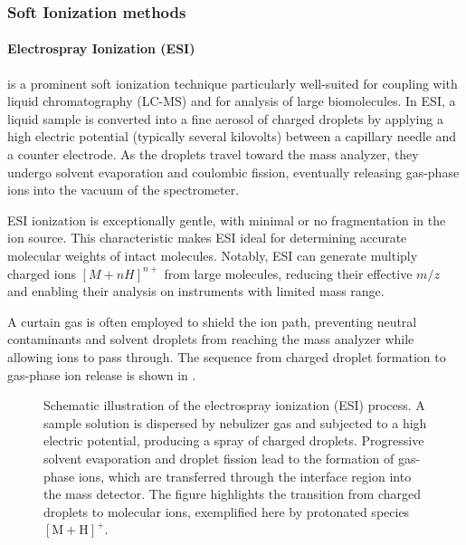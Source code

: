 \subsubsection{Soft Ionization methods}

\paragraph{Electrospray Ionization (ESI)} is a prominent soft ionization technique particularly well-suited for coupling with liquid chromatography (LC-MS) and for analysis of large biomolecules. \cite{Fenn1989}
In ESI, a liquid sample is converted into a fine aerosol of charged droplets by applying a high electric potential (typically several kilovolts) between a capillary needle and a counter electrode. \cite[p.~3]{Banerjee2012}
As the droplets travel toward the mass analyzer, they undergo solvent evaporation and coulombic fission, eventually releasing gas-phase ions into the vacuum of the spectrometer. \cite[p.~7]{Banerjee2012} \cite[p.~53]{Dass2007}

ESI ionization is exceptionally gentle, with minimal or no fragmentation in the ion source. \cite[p.~7]{Banerjee2012}
This characteristic makes ESI ideal for determining accurate molecular weights of intact molecules. \cite[p.~50]{Dass2007}
Notably, ESI can generate multiply charged ions $[M+nH]^{n+}$ from large molecules, reducing their effective $m/z$ and enabling their analysis on instruments with limited mass range. \cite[p.~50]{Dass2007}

A curtain gas is often employed to shield the ion path, preventing neutral contaminants and solvent droplets from reaching the mass analyzer while allowing ions to pass through. \cite[p.~42]{Hoffmann2011}
The sequence from charged droplet formation to gas-phase ion release is shown in .


\begin{figure}[H]
    \centering
    
    \caption[Schematic of ESI ionization]{
        Schematic illustration of the electrospray ionization (ESI) process.
        A sample solution is dispersed by nebulizer gas and subjected to a high electric potential, producing a spray of charged droplets.
        Progressive solvent evaporation and droplet fission lead to the formation of gas-phase ions, which are transferred through the interface region into the mass detector.
        The figure highlights the transition from charged droplets to molecular ions, exemplified here by protonated species \([\mathrm{M+H}]^{+}\).
    }
    \label{fig:esi-schematic}
    \cite[p.39]{Rockwood2018}
\end{figure}

